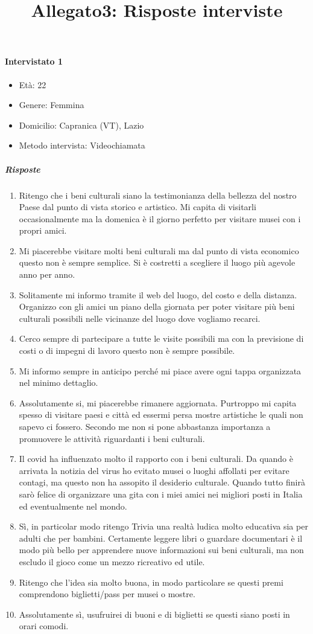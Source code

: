 \documentclass{article}
\title{\textbf{Allegato3: Risposte interviste}}
\date{}
\begin{document}
\maketitle

\paragraph{Intervistato 1}
\begin{itemize}
\item Età: 22
\item Genere: Femmina
\item Domicilio: Capranica (VT), Lazio
\item Metodo intervista: Videochiamata
\end{itemize}
\subparagraph{Risposte}
\begin{enumerate}
\item Ritengo che i beni culturali siano la testimonianza della bellezza del nostro Paese dal punto di vista storico e artistico. Mi capita di visitarli occasionalmente ma la domenica è il giorno perfetto per visitare musei con i propri amici.
\item  Mi piacerebbe visitare molti beni culturali ma dal punto di vista economico questo non è sempre semplice. Si è costretti a scegliere il luogo più agevole anno per anno.
\item Solitamente mi informo tramite il web del luogo, del costo e della distanza. Organizzo con gli amici un piano della giornata per poter visitare più beni culturali possibili nelle vicinanze del luogo dove vogliamo recarci.
\item Cerco sempre di partecipare a tutte le visite possibili ma con la previsione di costi o di impegni di lavoro questo non è sempre possibile.
\item Mi informo sempre in anticipo perché mi piace avere ogni tappa organizzata nel minimo dettaglio.
\item Assolutamente si, mi piacerebbe rimanere aggiornata. Purtroppo mi capita spesso di visitare paesi e città ed essermi persa mostre artistiche le quali non sapevo ci fossero. Secondo me non si pone abbastanza importanza a promuovere le attività riguardanti i beni culturali.
\item Il covid ha influenzato molto il rapporto con i beni culturali. Da quando è arrivata la notizia del virus ho evitato musei o luoghi affollati per evitare contagi, ma questo non ha assopito il desiderio culturale. Quando tutto finirà sarò felice di organizzare una gita con i miei amici nei migliori posti in Italia ed eventualmente nel mondo.
\item Sì, in particolar modo ritengo Trivia una realtà ludica molto educativa sia per adulti che per bambini. Certamente leggere libri o guardare documentari è il modo più bello per apprendere nuove informazioni sui beni culturali, ma non escludo il gioco come un mezzo ricreativo ed utile.
\item Ritengo che l'idea sia molto buona, in modo particolare se questi premi comprendono biglietti/pass per musei o mostre.
\item Assolutamente sì, usufruirei di buoni e di biglietti se questi siano posti in orari comodi.
\end{enumerate}
\end{document}
